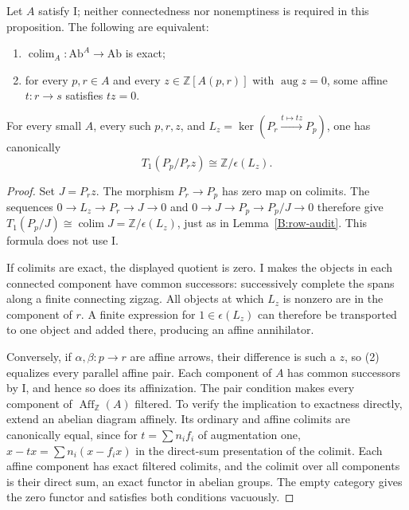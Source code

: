 \begin{proposition}\label{B:lead2}
Let $A$ satisfy I; neither connectedness nor nonemptiness is required
in this proposition.  The following are equivalent:
\begin{enumerate}
\item $\operatorname{colim}_A:\mathrm{Ab}^A\to\mathrm{Ab}$ is exact;
\item for every $p,r\in A$ and every $z\in\mathbb Z[A(p,r)]$
with $\operatorname{aug}z=0$, some affine $t:r\to s$ satisfies $tz=0$.
\end{enumerate}
For every small $A$, every such $p,r,z$, and
$L_z=\ker(P_r\xrightarrow{t\mapsto tz}P_p)$, one has canonically
\[
 T_1(P_p/P_rz)\cong\mathbb Z/\epsilon(L_z).
\]
\end{proposition}
\begin{proof}
Set $J=P_rz$.  The morphism $P_r\to P_p$ has zero map on colimits.
The sequences $0\to L_z\to P_r\to J\to0$ and
$0\to J\to P_p\to P_p/J\to0$ therefore give
$T_1(P_p/J)\cong\operatorname{colim}J
=\mathbb Z/\epsilon(L_z)$, just as in
Lemma~\ref{B:row-audit}.  This formula does not use I.

If colimits are exact, the displayed quotient is zero.  I makes the
objects in each connected component have common successors: successively
complete the spans along a finite connecting zigzag.  All objects at
which $L_z$ is nonzero are in the component of $r$.  A finite expression
for $1\in\epsilon(L_z)$ can therefore be transported to one object
and added there, producing an affine annihilator.

Conversely, if $\alpha,\beta:p\to r$ are affine arrows, their
difference is such a $z$, so (2) equalizes every parallel affine pair.
Each component of $A$ has common successors by I, and hence so does its
affinization.  The pair condition makes every component of
$\operatorname{Aff}_{\mathbb Z}(A)$ filtered.  To verify the implication
to exactness directly, extend an abelian diagram affinely.  Its ordinary
and affine colimits are canonically equal, since for
$t=\sum n_if_i$ of augmentation one,
$x-tx=\sum n_i(x-f_ix)$ in the direct-sum presentation of the colimit.
Each affine component has exact filtered colimits, and the colimit over
all components is their direct sum, an exact functor in abelian groups.
The empty category gives the zero functor and satisfies both conditions
vacuously.
\end{proof}

